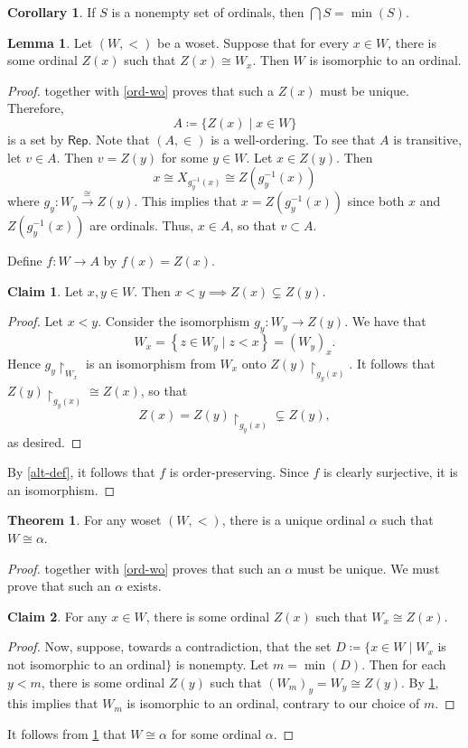 \documentclass[10pt,letterpaper,cm]{nupset}
\theoremstyle{definition}
\theoremstyle{theorem}
\newtheorem{theorem}[definition]{Theorem}
\newtheorem{lemma}[definition]{Lemma}
\newtheorem{corollary}[definition]{Corollary}
\newtheorem*{claim}{Claim}
\theoremstyle{remark}
\newcommand{\1}{\mathbf{1}}
\newcommand{\0}{\vec 0}
\begin{document}
\begin{corollary}
If $S$ is a nonempty set of ordinals, then  $\bigcap{S} = \min(S)$.
\end{corollary}

\begin{lemma}\label{PL}
Let $\left(W, <\right)$ be a woset. Suppose that for every $x\in W$, there is some ordinal $Z(x)$ such that $Z(x) \cong W_x$. Then $W$ is isomorphic to an ordinal. 
\end{lemma}
\begin{proof}
 together with \cref{ord-wo} proves that such a $Z(x)$ must be unique. Therefore, $$A\coloneqq \{Z(x) \mid x \in W\}$$ is a set by $\mathsf{Rep}$. Note that $\left(A, \in\right)$ is a well-ordering. To see that $A$ is transitive, let $v\in A$. Then $v = Z(y)$ for some $y\in W$. Let $x\in Z(y)$. Then $$ x \cong X_{g_y^{-1}(x)} \cong Z(g^{-1}_y(x))    $$ where $g_y : W_y \overset{\cong}{\longrightarrow} Z(y)$.  This implies that $x = Z(g^{-1}_y(x))$ since both $x$ and $Z(g^{-1}_y(x))$ are ordinals. Thus, $x \in A$, so that $v\subset A$.

\smallskip

Define $f : W \to A$ by $f(x) = Z(x)$. 
\begin{claim} 
Let $x,y\in W$. Then $x <y \implies Z(x) \subsetneq Z(y)$. 
\end{claim}
\begin{proof}
Let $x<y$. Consider the isomorphism $g_y : W_y \to Z(y)$. We have that $$W_x = \left\{z\in W_y \mid  z < x\right\} = \left(W_y\right)_x.$$ Hence $g_y\restriction_{W_x}$ is an isomorphism from $W_x$ onto $Z(y)\restriction_{g_y(x)}$. It follows that $Z(y)\restriction_{g_y(x)} \cong Z(x)$, so that $$Z(x) = Z(y)\restriction_{g_y(x)} \subsetneq Z(y),$$ as desired. 
\end{proof}
By \cref{alt-def}, it follows that $f$ is order-preserving. Since $f$ is clearly surjective, it is an isomorphism.
\end{proof}

\begin{theorem} 
For any woset $\left(W, <\right)$, there is a unique ordinal $\alpha$ such that $W \cong \alpha$.
\end{theorem}
\begin{proof}
 together with \cref{ord-wo} proves that such an $\alpha$ must be unique. We must prove that such an $\alpha$ exists.
\pagebreak
\begin{claim}
For any $x\in W$, there is some ordinal $Z(x)$ such that $W_x \cong Z(x)$.
\end{claim}
\begin{proof}
Now, suppose, towards a contradiction, that the set $D\coloneqq \{ x\in W \mid W_x$ is not isomorphic to an ordinal$\}$ is nonempty.   Let $m = \min(D)$. Then for each $y< m$, there is some ordinal $Z(y)$ such that $\left(W_m\right)_y = W_y \cong Z(y)$.  By \cref{PL}, this implies that $W_m$ is isomorphic to an ordinal, contrary to our choice of $m$.
\end{proof}It follows from \cref{PL} that $W \cong \alpha$ for some ordinal $\alpha$.
\end{proof}
\end{document}
